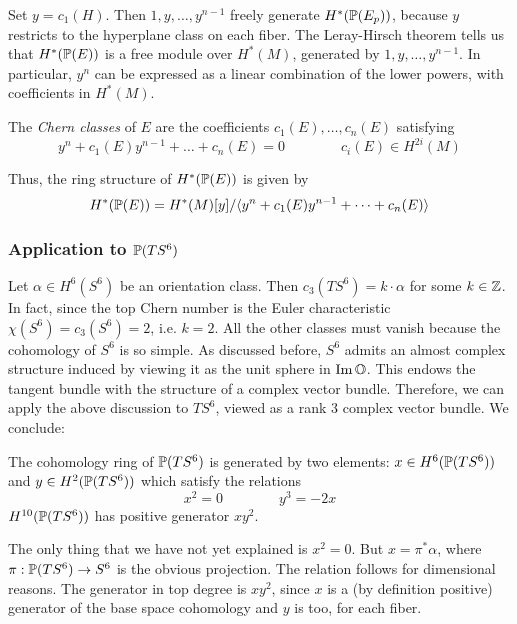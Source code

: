\documentclass{scrartcl}
\begin{document}
\medskip

Set $y=c_1(H)$. Then $1,y,\dots,y^{n-1}$ freely generate $H^*(\P(E_p))$, because $y$ restricts to the hyperplane class on each fiber.
The Leray-Hirsch theorem tells us that $H^*(\P(E))$ is a free module over $H^*(M)$, generated by $1,y,\dots,y^{n-1}$. In particular, $y^n$ can be expressed as a linear combination of the lower powers, with coefficients in $H^*(M)$.

\begin{mydef}
	The \emph{Chern classes} of $E$ are the coefficients $c_1(E),\dots,c_n(E)$ satisfying
	\begin{equation*}
		y^n+c_1(E)y^{n-1}+\dots+c_n(E)=0\qquad \qquad c_i(E)\in H^{2i}(M)
	\end{equation*}
\end{mydef}

Thus, the ring structure of $H^*(\P(E))$ is given by
\begin{equation*}
	H^*(\P(E))=H^*(M)[y]/\langle y^n+c_1(E)y^{n-1}+\dots + c_n(E)\rangle
\end{equation*}

\subsubsection{Application to $\P(TS^6)$}

Let $\alpha\in H^6(S^6)$ be an orientation class. Then $c_3(TS^6)=k\cdot \alpha$ for some $k\in\Z$. In fact, since the top Chern number is the Euler characteristic $\chi(S^6)=c_3(S^6)=2$, i.e. $k=2$. All the other classes must vanish because the cohomology of $S^6$ is so simple. As discussed before, $S^6$ admits an almost complex structure induced by viewing it as the unit sphere in $\Im \O$. This endows the tangent bundle with the structure of a complex vector bundle. Therefore, we can apply the above discussion to $TS^6$, viewed as a rank $3$ complex vector bundle. We conclude:

\begin{prop}
	The cohomology ring of $\P(TS^6)$ is generated by two elements: $x\in H^6(\P(TS^6))$ and $y\in H^2(\P(TS^6))$ which satisfy the relations
	\begin{equation*}
		x^2=0 \qquad \qquad y^3=-2 x
	\end{equation*}
	$H^{10}(\P(TS^6))$ has positive generator $xy^2$.
\end{prop}
\begin{myproof}
	The only thing that we have not yet explained is $x^2=0$. But $x=\pi^*\alpha$, where $\pi:\P(TS^6)\to S^6$ is the obvious projection. The relation follows for dimensional reasons. The generator in top degree is $xy^2$, since $x$ is a (by definition positive) generator of the base space cohomology and $y$ is too, for each fiber.
\end{myproof}
\end{document}
